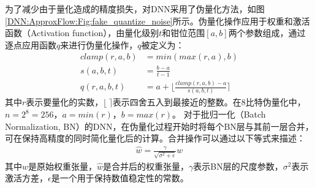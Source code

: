 为了减少由于量化造成的精度损失，对DNN采用了伪量化方法\cite{DNN:fake_quanti}，如图\ref{DNN:ApproxFlow:Fig:fake_quantize_noise}所示。伪量化操作应用于权重和激活函数（Activation function），由量化级别$t$和钳位范围$[a,b]$两个参数组成，通过逐点应用函数$q$来进行伪量化操作，$q$被定义为：
\begin{align}
    clamp(r, a, b) &= min(max(r, a), b) \\
    s(a, b, t)     &= \frac{b - a}{t - 1} \\
    q(r, a, b, t)  &= a + \lfloor \frac{clamp(r, a, b) - a}{s(a, b, t)} \rceil
\label{DNN:ApproxFlow:Eq:fake_quantize}
\end{align}
其中$r$表示要量化的实数，$\lfloor \ \rceil$表示四舍五入到最接近的整数。在8比特伪量化中，$n=2^8=256$，$a=min(r)$，$b=max(r)$。
对于批归一化（Batch Normalization, BN）的DNN，在伪量化过程开始时将每个BN层与其前一层合并，可在保持高精度的同时简化量化后的计算。合并操作可以通过以下等式来描述：
\begin{equation}
    \label{DNN:ApproxFlow:Eq:BN}
    \begin{aligned}
    \hat{w} = \frac{\gamma}{\sqrt{\sigma^2 + \epsilon}} w
    \end{aligned}
\end{equation}
其中$w$是原始权重张量，$\hat{w}$是合并后的权重张量，$\gamma$表示BN层的尺度参数，$\sigma ^2$表示激活方差，$\epsilon$是一个用于保持数值稳定性的常数。

